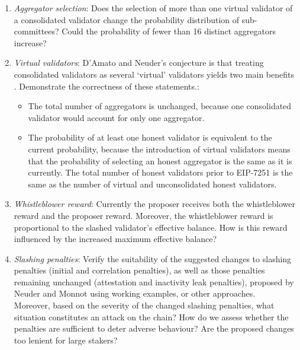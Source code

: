 \documentclass[UTF8]{article}
\begin{document}
\begin{enumerate}
\item \textit{Aggregator selection}: Does the selection of more than one virtual validator of a consolidated validator change the probability distribution of sub-committees? Could the probability of fewer than 16 distinct aggregators increase? 

\item \textit{Virtual validators}: D'Amato and Neuder's conjecture is that treating consolidated validators as several `virtual' validators yields two main benefits \cite{damato2023}. Demonstrate the correctness of these statements.:
	\begin{itemize}
	\item The total number of aggregators is unchanged, because one consolidated validator would account for only one aggregator.
	\item The probability of at least one honest validator is equivalent to the current probability, because the introduction of virtual validators means that the probability of selecting an honest aggregator is the same as it is currently. The total number of honest validators prior to EIP-7251 is the same as the number of virtual and unconsolidated honest validators.
	\end{itemize}

\item \textit{Whistleblower reward}: Currently the proposer receives both the whistleblower reward and the proposer reward. Moreover, the whistleblower reward is proportional to the slashed validator's effective balance. How is this reward influenced by the increased maximum effective balance?	

\item \textit{Slashing penalties}: Verify the suitability of the suggested changes to slashing penalties (initial and correlation penalties), as well as those penalties remaining unchanged (attestation and inactivity leak penalties), proposed by Neuder and Monnot \cite{Neuder2023d} using working examples, or other approaches.\\
Moreover, based on the severity of the changed slashing penalties, what situation constitutes an attack on the chain? How do we assess whether the penalties are sufficient to deter adverse behaviour? Are the proposed changes too lenient for large stakers?


\end{enumerate}
\end{document}
